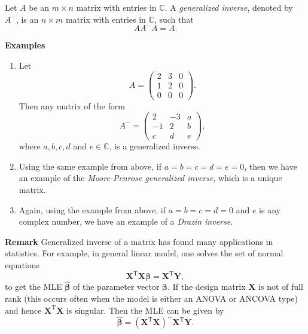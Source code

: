 \documentclass[12pt]{article}
\begin{document}
Let $A$ be an $m\times n$ matrix with entries in $\mathbb{C}$.  A \emph{generalized inverse}, denoted by $A^{-}$, is an $n\times m$ matrix with entries in $\mathbb{C}$, such that $$AA^{-}A=A.$$

\textbf{Examples}
\begin{enumerate}
\item Let $$A=\begin{pmatrix} 2&3&0 \\ 1&2&0 \\ 0&0&0 \end{pmatrix}.$$
Then any matrix of the form 
$$A^{-}=\begin{pmatrix} 2&-3&a \\ -1&2&b \\ c&d&e \end{pmatrix},$$
where $a,b,c,d$ and $e\in\mathbb{C}$, is a generalized inverse.
\item Using the same example from above, if $a=b=c=d=e=0$, then we have an example of the \emph{Moore-Penrose generalized inverse}, which is a unique matrix.
\item Again, using the example from above, if $a=b=c=d=0$ and $e$ is any complex number, we have an example of a \emph{Drazin inverse}.
\end{enumerate}

\textbf{Remark}
Generalized inverse of a matrix has found many applications in statistics.  For example, in general linear model, one solves the set of normal equations
$$\textbf{X}^{\operatorname{T}}\textbf{X}\boldsymbol{\beta}=\textbf{X}^{\operatorname{T}}\textbf{Y},$$
to get the MLE $\hat{\boldsymbol{\beta}}$ of the parameter vector $\boldsymbol{\beta}$.  If the design matrix $\textbf{X}$ is not of full rank (this occurs often when the model is either an ANOVA or ANCOVA type) and hence $\textbf{X}^{\operatorname{T}}\textbf{X}$ is singular.  Then the MLE can be given by
$$\hat{\boldsymbol{\beta}}=(\textbf{X}^{\operatorname{T}}\textbf{X})^{-}\textbf{X}^{\operatorname{T}}\textbf{Y}.$$
\end{document}
